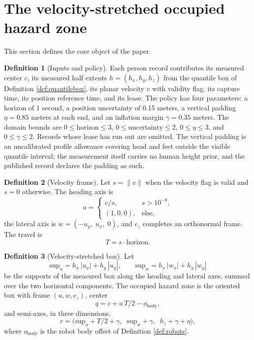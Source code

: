 \documentclass[10pt,a4paper]{article}
\theoremstyle{plain}
\theoremstyle{definition}
\newtheorem{definition}{Definition}[section]
\theoremstyle{remark}
\begin{document}
\section{The velocity-stretched occupied hazard zone}

This section defines the core object of the paper.

\begin{definition}[Inputs and policy]\label{def:ohzinputs}
Each person record contributes its measured center $c$, its measured half extents $h = (h_x, h_y, h_z)$ from the quantile box of Definition \ref{def:quantilebox}, its planar velocity $v$ with validity flag, its capture time, its position reference time, and its lease. The policy has four parameters: a horizon of 1 second, a position uncertainty of 0.15 meters, a vertical padding $\eta = 0.85$ meters at each end, and an inflation margin $\gamma = 0.35$ meters. The domain bounds are $0 \le \mathrm{horizon} \le 3$, $0 \le \mathrm{uncertainty} \le 2$, $0 \le \eta \le 3$, and $0 \le \gamma \le 2$. Records whose lease has run out are omitted. The vertical padding is an uncalibrated profile allowance covering head and feet outside the visible quantile interval; the measurement itself carries no human height prior, and the published record declares the padding as such.
\end{definition}

\begin{definition}[Velocity frame]\label{def:velframe}
Let $s = \|v\|$ when the velocity flag is valid and $s = 0$ otherwise. The heading axis is
\begin{equation}
u = \begin{cases} v / s, & s > 10^{-8}, \\ (1, 0, 0), & \text{else}, \end{cases}
\end{equation}
the lateral axis is $w = (-u_y,\; u_x,\; 0)$, and $e_z$ completes an orthonormal frame. The travel is
\begin{equation}
T = s \cdot \mathrm{horizon}.
\end{equation}
\end{definition}

\begin{definition}[Velocity-stretched box]\label{def:ohz}
Let
\begin{equation}
\mathrm{sup}_u = h_x\,|u_x| + h_y\,|u_y|, \qquad
\mathrm{sup}_w = h_x\,|w_x| + h_y\,|w_y|
\end{equation}
be the supports of the measured box along the heading and lateral axes, summed over the two horizontal components. The occupied hazard zone is the oriented box with frame $(u, w, e_z)$, center
\begin{equation}
q = c + u\,T/2 - o_{\mathrm{body}},
\end{equation}
and semi-axes, in three dimensions,
\begin{equation}
r = \bigl( \mathrm{sup}_u + T/2 + \gamma,\;\; \mathrm{sup}_w + \gamma,\;\; h_z + \gamma + \eta \bigr),
\end{equation}
where $o_{\mathrm{body}}$ is the robot body offset of Definition \ref{def:robots}.
\end{definition}
\end{document}

